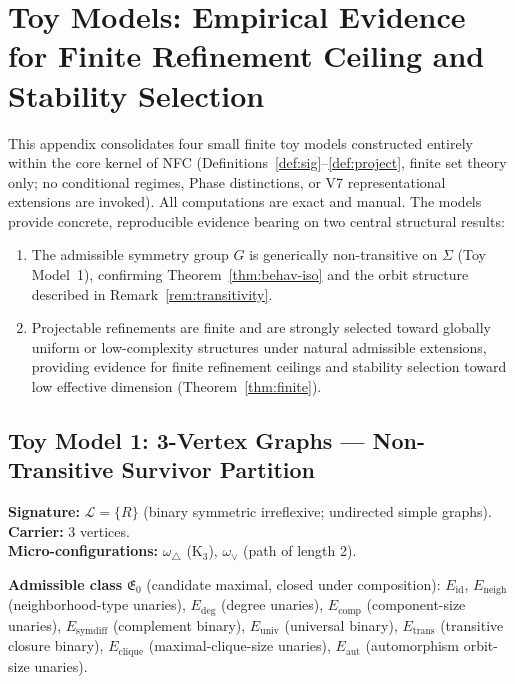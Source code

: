 \documentclass[11pt,a4paper]{article}
\theoremstyle{definition}
\theoremstyle{remark}
\begin{document}
\appendix
\section{Toy Models: Empirical Evidence for Finite Refinement Ceiling and Stability Selection}
\label{app:toy-models}

This appendix consolidates four small finite toy models constructed entirely within the core kernel of NFC (Definitions~\ref{def:sig}--\ref{def:project}, finite set theory only; no conditional regimes, Phase distinctions, or V7 representational extensions are invoked). All computations are exact and manual. The models provide concrete, reproducible evidence bearing on two central structural results:

\begin{enumerate}
  \item The admissible symmetry group $G$ is generically non-transitive on $\Sigma$ (Toy Model~1), confirming Theorem~\ref{thm:behav-iso} and the orbit structure described in Remark~\ref{rem:transitivity}.
  \item Projectable refinements are finite and are strongly selected toward globally uniform or low-complexity structures under natural admissible extensions, providing evidence for finite refinement ceilings and stability selection toward low effective dimension (Theorem~\ref{thm:finite}).
\end{enumerate}

\subsection{Toy Model 1: 3-Vertex Graphs --- Non-Transitive Survivor Partition}

\textbf{Signature:} $\mathcal{L}=\{R\}$ (binary symmetric irreflexive; undirected simple graphs).\\
\textbf{Carrier:} 3 vertices.\\
\textbf{Micro-configurations:} $\omega_\triangle$ (K$_3$), $\omega_\vee$ (path of length 2).

\textbf{Admissible class} $\mathfrak{E}_0$ (candidate maximal, closed under composition): $E_{\mathrm{id}}$, $E_{\mathrm{neigh}}$ (neighborhood-type unaries), $E_{\mathrm{deg}}$ (degree unaries), $E_{\mathrm{comp}}$ (component-size unaries), $E_{\mathrm{symdiff}}$ (complement binary), $E_{\mathrm{univ}}$ (universal binary), $E_{\mathrm{trans}}$ (transitive closure binary), $E_{\mathrm{clique}}$ (maximal-clique-size unaries), $E_{\mathrm{aut}}$ (automorphism orbit-size unaries).
\end{document}
